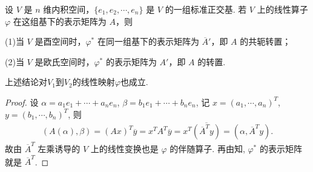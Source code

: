 \documentclass[../../main.tex]{subfiles}%
\begin{document}
\begin{theorem}\label{theorem:伴随算子的矩阵}
设 $V$ 是 $n$ 维内积空间，$\{e_1,e_2,\cdots,e_n\}$ 是 $V$ 的一组标准正交基. 若 $V$ 上的线性算子 $\varphi$ 在这组基下的表示矩阵为 $A$，则

(1)当 $V$ 是酉空间时，$\varphi^*$ 在同一组基下的表示矩阵为 $\overline{A}'$，即 $A$ 的共轭转置；

(2)当 $V$ 是欧氏空间时，$\varphi^*$ 的表示矩阵为 $A'$，即 $A$ 的转置.
\end{theorem}
\begin{remark}
上述结论对$V_1$到$V_2$的线性映射$\varphi $也成立.
\end{remark}
\begin{proof}
设 $\alpha=a_1e_1+\cdots+a_ne_n$, $\beta=b_1e_1+\cdots+b_ne_n$, 记 $x=(a_1,\cdots,a_n)^T$, $y=(b_1,\cdots,b_n)^T$, 则
\begin{align*}
(A(\alpha),\beta)=(Ax)^T\overline{y}=x^TA^T\overline{y}=x^T\overline{(\overline{A}^Ty)}=(\alpha,\overline{A}^Ty).
\end{align*}
故由 $\overline{A}^T$ 左乘诱导的 $V$ 上的线性变换也是 $\varphi$ 的伴随算子. 再由知, $\varphi^*$ 的表示矩阵就是 $\overline{A}^T$.
\end{proof}
\end{document}
